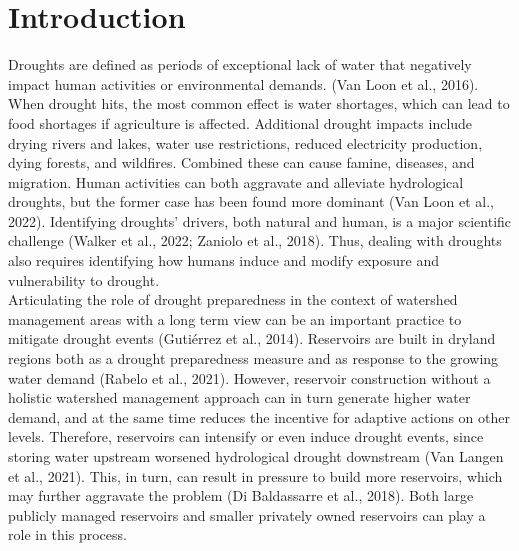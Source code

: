 \documentclass[draft]{agujournal2019}
\begin{document}
\section{Introduction}
Droughts are defined as periods of exceptional lack of water that negatively impact human activities or environmental demands. (Van Loon et al., 2016). When drought hits, the most common effect is water shortages, which can lead to food shortages if agriculture is affected. Additional drought impacts include drying rivers and lakes, water use restrictions, reduced electricity production, dying forests, and wildfires. Combined these can cause famine, diseases, and migration.  Human activities can both aggravate and alleviate hydrological droughts, but the former case has been found more dominant (Van Loon et al., 2022). Identifying droughts’ drivers, both natural and human, is a major scientific challenge (Walker et al., 2022; Zaniolo et al., 2018). Thus, dealing with droughts also requires identifying how humans induce and modify exposure and vulnerability to drought.\\
Articulating the role of drought preparedness in the context of watershed management areas with a long term view can be an important practice to mitigate drought events (Gutiérrez et al., 2014). Reservoirs are built in dryland regions both as a drought preparedness measure and as response to the growing water demand (Rabelo et al., 2021). However, reservoir construction without a holistic watershed management approach can in turn generate higher water demand, and at the same time reduces the incentive for adaptive actions on other levels. Therefore, reservoirs can intensify or even induce drought events, since storing water upstream worsened hydrological drought downstream (Van Langen et al., 2021). This, in turn, can result in pressure to build more reservoirs, which may further aggravate the problem (Di Baldassarre et al., 2018). Both large publicly managed reservoirs and smaller privately owned reservoirs can play a role in this process.\\
\end{document}
